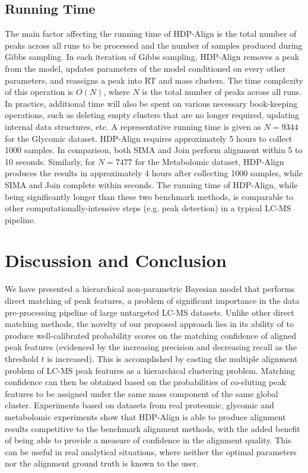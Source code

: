 \subsection{Running Time}
\label{sub:running-time}

The main factor affecting the running time of HDP-Align is the total number of peaks across all runs to be processed and the number of samples produced during Gibbs sampling. In each iteration of Gibbs sampling, HDP-Align removes a peak from the model, updates parameters of the model conditioned on every other parameters, and reassigns a peak into RT and mass clusters. The time complexity of this operation is $O(N)$, where $N$ is the total number of peaks across all runs. In practice, additional time will also be spent on various necessary book-keeping operations, such as deleting empty clusters that are no longer required, updating internal data structures, etc. A representative running time is given as $N=9344$ for the Glycomic dataset. HDP-Align requires approximately 5 hours to collect 1000 samples. In comparison, both SIMA and Join perform alignment within 5 to 10 seconds. Similarly, for $N=7477$ for the Metabolomic dataset, HDP-Align produces the results in approximately 4 hours after collecting 1000 samples, while SIMA and Join complete within seconds. The running time of HDP-Align, while being significantly longer than these two benchmark methods, is comparable to other computationally-intensive steps (e.g. peak detection) in a typical LC-MS pipeline.

\section{Discussion and Conclusion}

\label{sec:conc}

We have presented a hierarchical non-parametric Bayesian model that performs direct matching of peak features, a problem of significant importance in the data pre-processing pipeline of large untargeted LC-MS datasets. Unlike other direct matching methods, the novelty of our proposed approach lies in its ability of to produce well-calibrated probability scores on the matching confidence of aligned peak features (evidenced by the increasing precision and decreasing recall as the threshold $t$ is increased). This is accomplished by casting the multiple alignment problem of LC-MS peak features as a hierarchical clustering problem. Matching confidence can then be obtained based on the probabilities of co-eluting peak features to be assigned under the same mass component of the same global cluster. Experiments based on datasets from real proteomic, glycomic and metabolomic experiments show that HDP-Align is able to produce alignment results competitive to the benchmark alignment methods, with the added benefit of being able to provide a measure of confidence in the alignment quality. This can be useful in real analytical situations, where neither the optimal parameters nor the alignment ground truth is known to the user.

